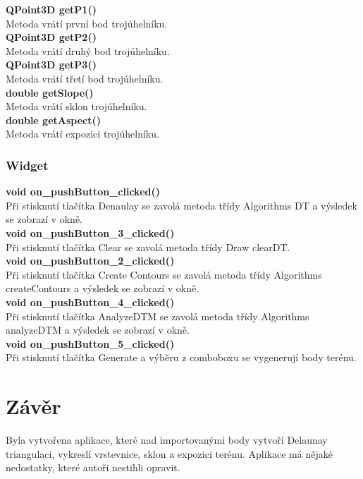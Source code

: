 \documentclass[a4paper, 12pt]{article}
\begin{document}
\textbf{ QPoint3D getP1()}\\
Metoda vrátí první bod trojúhelníku.\\

\textbf{ QPoint3D getP2()}\\
Metoda vrátí druhý bod trojúhelníku.\\

\textbf{ QPoint3D getP3()}\\
Metoda vrátí třetí bod trojúhelníku.\\

\textbf{double getSlope()}\\
Metoda vrátí sklon trojúhelníku.\\

\textbf{double getAspect()}\\
Metoda vrátí expozici trojúhelníku.\\

\subsubsection{Widget}

\textbf{void on\_pushButton\_clicked()}\\
Při stisknutí tlačítka Denaulay se zavolá metoda třídy Algorithms DT a výsledek se zobrazí v okně.
\\

\textbf{void on\_pushButton\_3\_clicked()}\\
Při stisknutí tlačítka Clear se zavolá metoda třídy Draw clearDT.
\\

\textbf{void on\_pushButton\_2\_clicked()}\\
Při stisknutí tlačítka Create Contours se zavolá metoda třídy Algorithms createContours a výsledek se zobrazí v okně.
\\

\textbf{void on\_pushButton\_4\_clicked()}\\
Při stisknutí tlačítka AnalyzeDTM se zavolá metoda třídy Algorithms analyzeDTM a výsledek se zobrazí v okně.
\\

\textbf{void on\_pushButton\_5\_clicked()}\\
Při stisknutí tlačítka Generate a výběru z comboboxu se vygenerují body terénu.
\\



\clearpage
\section{Závěr}
Byla vytvořena aplikace, které nad importovanými body vytvoří Delaunay triangulaci, vykreslí vrstevnice, sklon a expozici terénu. Aplikace má nějaké nedostatky, které autoři nestihli opravit.\\
\end{document}
